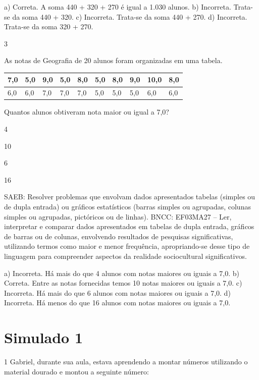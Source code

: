 \begin{escolha}
{\begin{escolha}
{a) Correta.  A soma 440 + 320 + 270 é igual a 1.030 alunos.
b) Incorreta. Trata-se da soma 440 + 320.
c) Incorreta. Trata-se da soma 440 + 270.
d) Incorreta. Trata-se da soma 320 + 270.

\num{3}

As notas de Geografia de 20 alunos foram organizadas em uma tabela.

\begin{longtable}[]{@{}llllllllll@{}}
\toprule
7,0 & 5,0 & 9,0 & 5,0 & 8,0 & 5,0 & 8,0 & 9,0 & 10,0 &
8,0\tabularnewline
\midrule
\endhead
6,0 & 6,0 & 7,0 & 7,0 & 7,0 & 5,0 & 5,0 & 5,0 & 6,0 & 6,0\tabularnewline
\bottomrule
\end{longtable}

Quantos alunos obtiveram nota maior ou igual a 7,0?

\begin{escolha}
\item
  4
\item
  10
\item
  6
\item
  16
\end{escolha}

SAEB: Resolver problemas que envolvam dados apresentados tabelas (simples ou de dupla entrada) ou gráficos estatísticos (barras simples ou agrupadas, colunas simples ou agrupadas, pictóricos ou de linhas). 
BNCC: EF03MA27 -- Ler, interpretar e comparar dados apresentados em tabelas de dupla entrada,
gráficos de barras ou de colunas, envolvendo resultados de pesquisas significativas, utilizando
termos como maior e menor frequência, apropriando-se desse tipo de linguagem para
compreender aspectos da realidade sociocultural significativos.

a) Incorreta. Há mais do que 4 alunos com notas maiores ou iguais a 7,0.
b) Correta. Entre as notas fornecidas temos 10 notas maiores ou iguais a 7,0.
c) Incorreta. Há mais do que 6 alunos com notas maiores ou iguais a 7,0.
d) Incorreta. Há menos do que 16 alunos com notas maiores ou iguais a 7,0.


\chapter{Simulado 1}

\num{1} Gabriel, durante sua aula, estava aprendendo a montar números utilizando o
material dourado e montou a seguinte número:


}
\end{escolha}}
\end{escolha}
